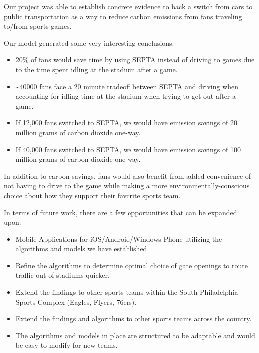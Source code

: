 Our project was able to establish concrete evidence to back a switch
from cars to public transportation as a way to reduce carbon emissions
from fans traveling to/from sports games.

Our model generated some very interesting conclusions:
\begin{itemize}
    \item 20\% of fans would save time by using SEPTA instead of
  driving to games due to the time spent idling at the stadium after a
  game.
    \item {\textasciitilde{}}40000 fans face a 20 minute tradeoff between SEPTA and
  driving when accounting for idling time at the stadium when trying
  to get out after a game.
    \item If 12,000 fans switched to SEPTA, we would have emission
  savings of 20 million grams of carbon dioxide one-way.
    \item If 40,000 fans switched to SEPTA, we would have emission
  savings of 100 million grams of carbon dioxide one-way.
\end{itemize}

In addition to carbon savings, fans would also benefit from added
convenience of not having to drive to the game while making a more
environmentally-conscious choice about how they support their favorite
sports team.

In terms of future work, there are a few opportunities that can be
expanded upon:
\begin{itemize}
    \item Mobile Applications for iOS/Android/Windows Phone utilizing
  the algorithms and models we have established.
    \item Refine the algorithms to determine optimal choice of gate
  openings to route traffic out of stadiums quicker.
    \item Extend the findings to other sports teams within the South
  Philadelphia Sports Complex (Eagles, Flyers, 76ers).
    \item Extend the findings and algorithms to other sports teams
  across the country.
    \item The algorithms and models in place are structured to be
  adaptable and would be easy to modify for new teams.
\end{itemize}
